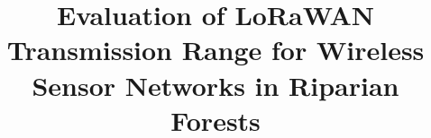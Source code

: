 %
%
%
%
%
%
\documentclass[smallextended,natbib]{svjour3}       %
%
\smartqed  %
%
\usepackage{amsmath}
\usepackage{booktabs}
\usepackage[T1]{fontenc}
\usepackage[utf8]{inputenc}
\usepackage{float}
\usepackage{graphicx}
\usepackage{booktabs}
\usepackage{enumitem}
\usepackage[hyphens]{url}
%
%
%
%
%


\title{Evaluation of LoRaWAN Transmission Range for Wireless Sensor Networks in Riparian Forests%
}


